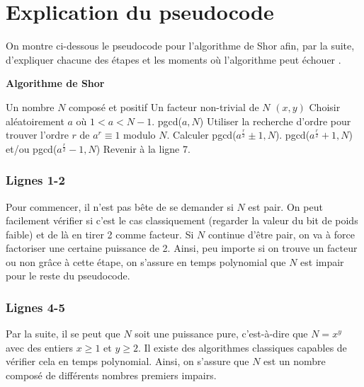 \section{Explication du pseudocode}
On montre ci-dessous le pseudocode pour l'algorithme de Shor afin, par la suite, d'expliquer chacune des étapes et les moments où l'algorithme peut échouer \cite{nielsen00}.

\begin{algorithm}[H]
    \caption*{\textbf{Algorithme de Shor}}
    \begin{algorithmic}[1]
    \REQUIRE Un nombre $N$ composé et positif
    \ENSURE Un facteur non-trivial de $N$
    \ENDIF
        \RETURN $(x,y)$
    \ENDIF
    \STATE Choisir aléatoirement $a$ où $1 < a < N-1$. 
        \RETURN pgcd($a,N$)
    \ENDIF
    \STATE Utiliser la recherche d'ordre pour trouver l'ordre $r$ de $a^r \equiv 1$ modulo $N$.
        \STATE Calculer pgcd($a^{\frac{r}{2}} \pm 1, N$). 
            \RETURN pgcd($a^{\frac{r}{2}} + 1, N$) et/ou pgcd($a^{\frac{r}{2}} - 1, N$)
        \ENDIF
    \ENDIF Revenir à la ligne 7.
    \end{algorithmic}
    \end{algorithm}

\subsubsection*{Lignes 1-2}
Pour commencer, il n'est pas bête de se demander si $N$ est pair. On peut facilement vérifier si c'est le cas classiquement (regarder la valeur du bit de poids faible) et de là en tirer 2 comme facteur. Si $N$ continue d'être pair, on va à force factoriser une certaine puissance de 2. Ainsi, peu importe si on trouve un facteur ou non grâce à cette étape, on s'assure en temps polynomial que $N$ est impair pour le reste du pseudocode.

\subsubsection*{Lignes 4-5}
Par la suite, il se peut que $N$ soit une puissance pure, c'est-à-dire que $N = x^y$ avec des entiers $x \geq 1$ et $y \geq 2$. Il existe des algorithmes classiques capables de vérifier cela en temps polynomial. Ainsi, on s'assure que $N$ est un nombre composé de différents nombres premiers impairs.

